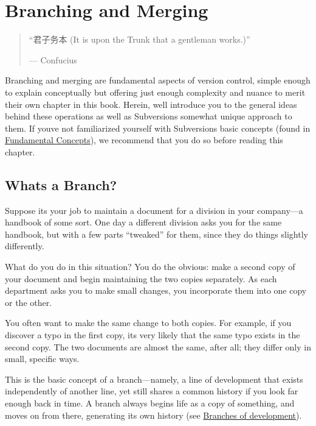\chapter{Branching and Merging}\label{svn.branchmerge}

\begin{quote}
``君子务本 (It is upon the Trunk that a gentleman works.)''

--- Confucius
\end{quote}

Branching and merging are fundamental aspects of version control, simple
enough to explain conceptually but offering just enough complexity and
nuance to merit their own chapter in this book. Herein,
we\textquotesingle ll introduce you to the general ideas behind these
operations as well as Subversion\textquotesingle s somewhat unique
approach to them. If you\textquotesingle ve not familiarized yourself
with Subversion\textquotesingle s basic concepts (found in
\hyperref[svn.basic]{Fundamental Concepts}), we recommend that you do so
before reading this chapter.

\section{What\textquotesingle s a Branch?}\label{svn.branchmerge.whatis}

Suppose it\textquotesingle s your job to maintain a document for a
division in your company---a handbook of some sort. One day a different
division asks you for the same handbook, but with a few parts
``tweaked'' for them, since they do things slightly differently.

What do you do in this situation? You do the obvious: make a second copy
of your document and begin maintaining the two copies separately. As
each department asks you to make small changes, you incorporate them
into one copy or the other.

You often want to make the same change to both copies. For example, if
you discover a typo in the first copy, it\textquotesingle s very likely
that the same typo exists in the second copy. The two documents are
almost the same, after all; they differ only in small, specific ways.

This is the basic concept of a branch---namely, a line of development
that exists independently of another line, yet still shares a common
history if you look far enough back in time. A branch always begins life
as a copy of something, and moves on from there, generating its own
history (see \hyperref[svn.branchmerge.whatis.dia-1]{Branches of
development}).

